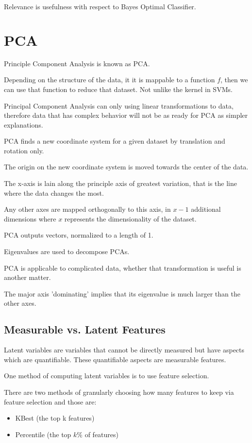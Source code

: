 \documentclass{article}
\begin{document}
Relevance is usefulness with respect to Bayes Optimal Classifier. 

\section{PCA}

Principle Component Analysis is known as PCA. 

Depending on the structure of the data, it it is mappable to a function $f$, 
then we can use that function to reduce that dataset. Not unlike the kernel in 
SVMs.

Principal Component Analysis can only using linear transformations to data, 
therefore data that has complex behavior will not be as ready for PCA as
simpler explanations. 

PCA finds a new coordinate system for a given dataset by translation and 
rotation only. 

The origin on the new coordinate system is moved towards the center of the data.

The x-axis is lain along the principle axis of greatest variation, that is 
the line where the data changes the most. 

Any other axes are mapped orthogonally to this axis, in $x - 1$ additional 
dimensions where $x$ represents the dimensionality of the dataset. 

PCA outputs vectors, normalized to a length of 1. 

Eigenvalues are used to decompose PCAs. 

PCA is applicable to complicated data, whether that transformation is useful is
another matter. 

The major axis 'dominating' implies that its eigenvalue is much larger than the 
other axes. 

\subsection{Measurable vs. Latent Features}

Latent variables are variables that cannot be directly measured but have aspects
which are quantifiable. These quantifiable aspects are measurable features. 

One method of computing latent variables is to use feature selection. 

There are two methods of granularly choosing how many features to keep via
feature selection and those are:
\begin{itemize}
	\item KBest (the top k features)
	\item Percentile (the top $k\%$ of features)
\end{itemize}
\end{document}
